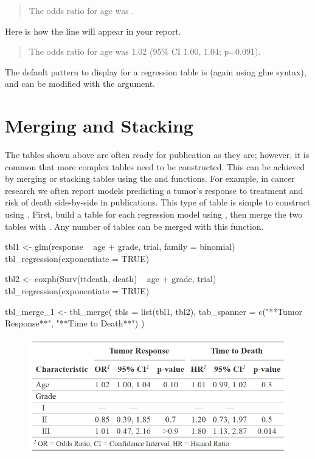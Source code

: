 \begin{quote}
The odds ratio for age was .
\end{quote}

Here is how the line will appear in your report.

\begin{quote}
The odds ratio for age was 1.02 (95\% CI 1.00, 1.04; p=0.091).
\end{quote}

The default pattern to display for a regression table is  (again using glue syntax), and can be modified with the  argument.

\section{Merging and Stacking}

The  tables shown above are often ready for publication as they are; however, it is common that more complex tables need to be constructed. This can be achieved by merging or stacking  tables using the  and  functions.
For example, in cancer research we often report models predicting a tumor’s response to treatment and risk of death side-by-side in publications.
This type of table is simple to construct using .
First, build a table for each regression model using , then merge the two tables with .
Any number of  tables can be merged with this function.

\begin{example}
tbl1 <-
  glm(response ~ age + grade, trial, family = binomial) %
  tbl_regression(exponentiate = TRUE)

tbl2 <-
  coxph(Surv(ttdeath, death) ~ age + grade, trial) %
  tbl_regression(exponentiate = TRUE)

tbl_merge_1 <-
  tbl_merge(
    tbls = list(tbl1, tbl2),
    tab_spanner = c("**Tumor Response**", "**Time to Death**")
  )
\end{example}
\newpage

\begin{figure}[h!]
  \includegraphics[scale=0.73]{merge.png}
  \centering
\end{figure}

